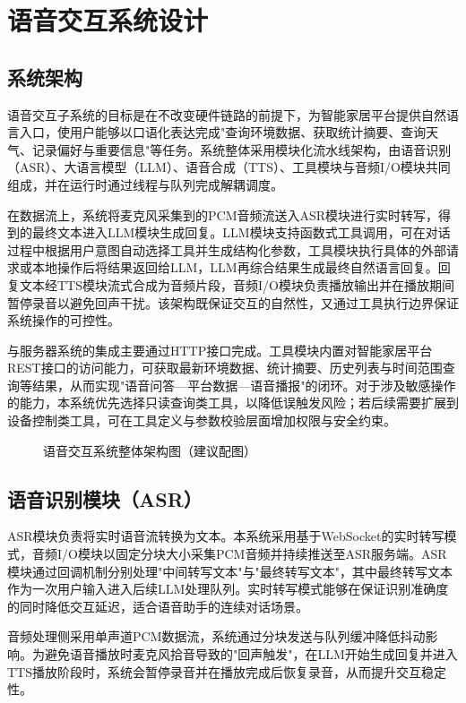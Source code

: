 
\section{语音交互系统设计}

\subsection{系统架构}
\par 语音交互子系统的目标是在不改变硬件链路的前提下，为智能家居平台提供自然语言入口，使用户能够以口语化表达完成"查询环境数据、获取统计摘要、查询天气、记录偏好与重要信息"等任务。系统整体采用模块化流水线架构，由语音识别（ASR）、大语言模型（LLM）、语音合成（TTS）、工具模块与音频I/O模块共同组成，并在运行时通过线程与队列完成解耦调度。
\par 在数据流上，系统将麦克风采集到的PCM音频流送入ASR模块进行实时转写，得到的最终文本进入LLM模块生成回复。LLM模块支持函数式工具调用，可在对话过程中根据用户意图自动选择工具并生成结构化参数，工具模块执行具体的外部请求或本地操作后将结果返回给LLM，LLM再综合结果生成最终自然语言回复。回复文本经TTS模块流式合成为音频片段，音频I/O模块负责播放输出并在播放期间暂停录音以避免回声干扰。该架构既保证交互的自然性，又通过工具执行边界保证系统操作的可控性。
\par 与服务器系统的集成主要通过HTTP接口完成。工具模块内置对智能家居平台REST接口的访问能力，可获取最新环境数据、统计摘要、历史列表与时间范围查询等结果，从而实现"语音问答—平台数据—语音播报"的闭环。对于涉及敏感操作的能力，本系统优先选择只读查询类工具，以降低误触发风险；若后续需要扩展到设备控制类工具，可在工具定义与参数校验层面增加权限与安全约束。

\begin{figure}[H]
\centering
{}
\caption{语音交互系统整体架构图（建议配图）}
\label{fig:voice_system_architecture}
\end{figure}

\subsection{语音识别模块（ASR）}
\par ASR模块负责将实时语音流转换为文本。本系统采用基于WebSocket的实时转写模式，音频I/O模块以固定分块大小采集PCM音频并持续推送至ASR服务端。ASR模块通过回调机制分别处理"中间转写文本"与"最终转写文本"，其中最终转写文本作为一次用户输入进入后续LLM处理队列。实时转写模式能够在保证识别准确度的同时降低交互延迟，适合语音助手的连续对话场景。
\par 音频处理侧采用单声道PCM数据流，系统通过分块发送与队列缓冲降低抖动影响。为避免语音播放时麦克风拾音导致的"回声触发"，在LLM开始生成回复并进入TTS播放阶段时，系统会暂停录音并在播放完成后恢复录音，从而提升交互稳定性。

